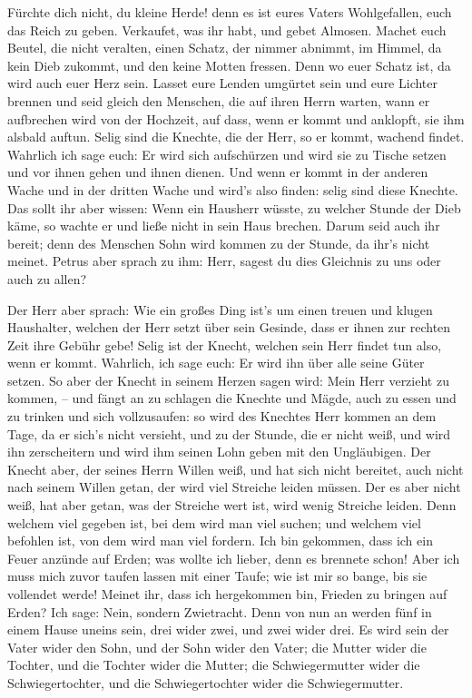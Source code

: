  Fürchte dich nicht, du kleine Herde! denn es ist eures
Vaters Wohlgefallen, euch das Reich zu geben.  Verkaufet,
was ihr habt, und gebet Almosen. Machet euch Beutel, die nicht veralten,
einen Schatz, der nimmer abnimmt, im Himmel, da kein Dieb zukommt, und
den keine Motten fressen.  Denn wo euer Schatz ist, da
wird auch euer Herz sein.  Lasset eure Lenden umgürtet
sein und eure Lichter brennen  und seid gleich den
Menschen, die auf ihren Herrn warten, wann er aufbrechen wird von der
Hochzeit, auf dass, wenn er kommt und anklopft, sie ihm alsbald auftun.
 Selig sind die Knechte, die der Herr, so er kommt,
wachend findet. Wahrlich ich sage euch: Er wird sich aufschürzen und
wird sie zu Tische setzen und vor ihnen gehen und ihnen dienen.
 Und wenn er kommt in der anderen Wache und in der
dritten Wache und wird's also finden: selig sind diese Knechte.
 Das sollt ihr aber wissen: Wenn ein Hausherr wüsste, zu
welcher Stunde der Dieb käme, so wachte er und ließe nicht in sein Haus
brechen.  Darum seid auch ihr bereit; denn des Menschen
Sohn wird kommen zu der Stunde, da ihr's nicht meinet. 
Petrus aber sprach zu ihm: Herr, sagest du dies Gleichnis zu uns oder
auch zu allen?

 Der Herr aber sprach: Wie ein großes Ding ist's um einen
treuen und klugen Haushalter, welchen der Herr setzt über sein Gesinde,
dass er ihnen zur rechten Zeit ihre Gebühr gebe!  Selig
ist der Knecht, welchen sein Herr findet tun also, wenn er kommt.
 Wahrlich, ich sage euch: Er wird ihn über alle seine
Güter setzen.  So aber der Knecht in seinem Herzen sagen
wird: Mein Herr verzieht zu kommen, -- und fängt an zu schlagen die
Knechte und Mägde, auch zu essen und zu trinken und sich vollzusaufen:
 so wird des Knechtes Herr kommen an dem Tage, da er
sich's nicht versieht, und zu der Stunde, die er nicht weiß, und wird
ihn zerscheitern und wird ihm seinen Lohn geben mit den Ungläubigen.
 Der Knecht aber, der seines Herrn Willen weiß, und hat
sich nicht bereitet, auch nicht nach seinem Willen getan, der wird viel
Streiche leiden müssen.  Der es aber nicht weiß, hat aber
getan, was der Streiche wert ist, wird wenig Streiche leiden. Denn
welchem viel gegeben ist, bei dem wird man viel suchen; und welchem viel
befohlen ist, von dem wird man viel fordern.  Ich bin
gekommen, dass ich ein Feuer anzünde auf Erden; was wollte ich lieber,
denn es brennete schon!  Aber ich muss mich zuvor taufen
lassen mit einer Taufe; wie ist mir so bange, bis sie vollendet werde!
 Meinet ihr, dass ich hergekommen bin, Frieden zu bringen
auf Erden? Ich sage: Nein, sondern Zwietracht.  Denn von
nun an werden fünf in einem Hause uneins sein, drei wider zwei, und zwei
wider drei.  Es wird sein der Vater wider den Sohn, und
der Sohn wider den Vater; die Mutter wider die Tochter, und die Tochter
wider die Mutter; die Schwiegermutter wider die Schwiegertochter, und
die Schwiegertochter wider die Schwiegermutter.

